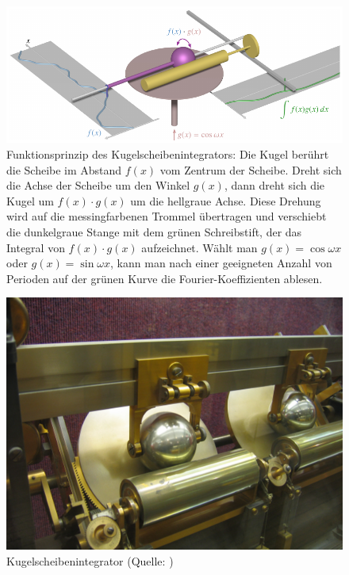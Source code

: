\begin{figure}
	\centering
	\includegraphics[width=\textwidth]{papers/gezeiten/images/ksi.pdf}
	\caption{Funktionsprinzip des Kugelscheibenintegrators:
		Die Kugel berührt die Scheibe
		im Abstand $f(x)$ vom Zentrum der Scheibe.
		Dreht sich die Achse der Scheibe um den Winkel $g(x)$,
		dann dreht sich die Kugel um $f(x)\cdot g(x)$ um die
		hellgraue Achse.
		Diese Drehung wird auf die messingfarbenen Trommel
		übertragen und verschiebt die dunkelgraue Stange mit
		dem grünen Schreibstift, der das Integral von
		$f(x)\cdot g(x)$ aufzeichnet.
		Wählt man $g(x)=\cos \omega x$ oder $g(x)=\sin\omega x$,
		kann man nach einer geeigneten Anzahl von Perioden auf der
		grünen Kurve die Fourier-Koeffizienten ablesen.
	\label{fig:skizze-integralmaschine}}
\end{figure}
\begin{figure}
	\centering
	\includegraphics[width=\textwidth]{papers/gezeiten/Harmonic_analyser_disc_and_sphere.jpg}
	\caption{Kugelscheibenintegrator (Quelle:
		\cite{gezeiten:KugelScheibenIntegrator})
	\label{fig:harmonicanalyserdiscandsphere}}
\end{figure}

